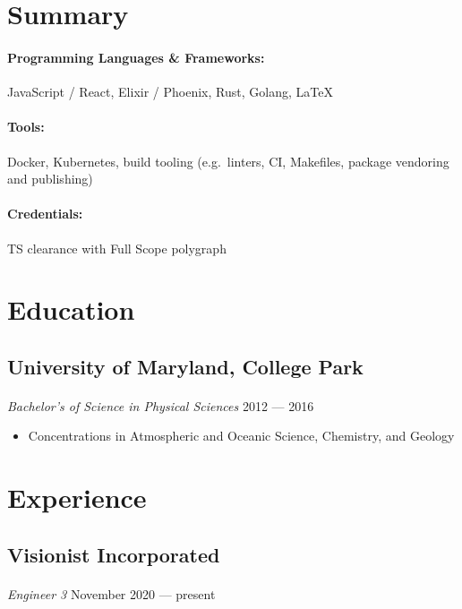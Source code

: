 \documentclass[10pt]{article}
\begin{document}

\section*{Summary}
\paragraph{Programming Languages \& Frameworks:} JavaScript / React, Elixir /
Phoenix, Rust, Golang, \LaTeX\@

\paragraph{Tools:} Docker, Kubernetes, build tooling (e.g.\ linters, CI,
Makefiles, package vendoring and publishing)

\paragraph{Credentials:} TS clearance with Full Scope polygraph

\dotfill

\section*{Education}
\subsection*{University of Maryland, College Park}
\paragraph{}
\textit{Bachelor's of Science in Physical Sciences} \hfill 2012 --- 2016

\begin{itemize}
  \item Concentrations in Atmospheric and Oceanic Science, Chemistry, and Geology
\end{itemize}

\dotfill

\section*{Experience}
\subsection*{Visionist Incorporated}
\paragraph{}
\textit{Engineer 3} \hfill November 2020 --- present
\end{document}
